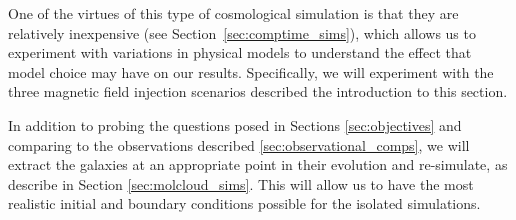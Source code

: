 One of the virtues of this type of cosmological simulation is that
they are relatively inexpensive (see Section~\ref{sec:comptime_sims}),
which allows us to experiment with variations in physical models to
understand the effect that model choice may have on our results.
Specifically, we will experiment with
the three magnetic field injection scenarios described the introduction to this
section.  

In addition to probing the questions posed in Sections
\ref{sec:objectives} and comparing to the observations described
\ref{sec:observational_comps}, we will
extract the galaxies at an appropriate point in their evolution and re-simulate,
as describe in Section \ref{sec:molcloud_sims}.  This will allow us to have the
most realistic initial and boundary conditions possible for the isolated
simulations.




